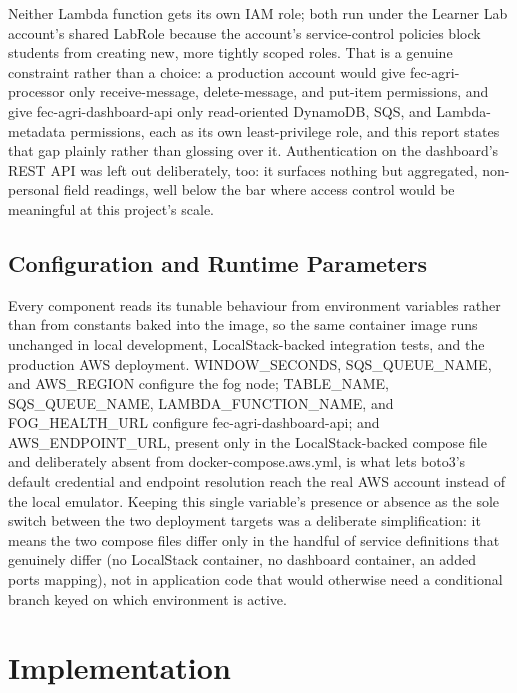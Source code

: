 \documentclass[conference]{IEEEtran}
\begin{document}
Neither Lambda function gets its own IAM role; both run under the Learner Lab account's shared LabRole because the account's service-control policies block students from creating new, more tightly scoped roles. That is a genuine constraint rather than a choice: a production account would give fec-agri-processor only receive-message, delete-message, and put-item permissions, and give fec-agri-dashboard-api only read-oriented DynamoDB, SQS, and Lambda-metadata permissions, each as its own least-privilege role, and this report states that gap plainly rather than glossing over it. Authentication on the dashboard's REST API was left out deliberately, too: it surfaces nothing but aggregated, non-personal field readings, well below the bar where access control would be meaningful at this project's scale.

\subsection{Configuration and Runtime Parameters}
Every component reads its tunable behaviour from environment variables rather than from constants baked into the image, so the same container image runs unchanged in local development, LocalStack-backed integration tests, and the production AWS deployment. WINDOW\_SECONDS, SQS\_QUEUE\_NAME, and AWS\_REGION configure the fog node; TABLE\_NAME, SQS\_QUEUE\_NAME, LAMBDA\_FUNCTION\_NAME, and FOG\_HEALTH\_URL configure fec-agri-dashboard-api; and AWS\_ENDPOINT\_URL, present only in the LocalStack-backed compose file and deliberately absent from docker-compose.aws.yml, is what lets boto3's default credential and endpoint resolution reach the real AWS account instead of the local emulator. Keeping this single variable's presence or absence as the sole switch between the two deployment targets was a deliberate simplification: it means the two compose files differ only in the handful of service definitions that genuinely differ (no LocalStack container, no dashboard container, an added ports mapping), not in application code that would otherwise need a conditional branch keyed on which environment is active.

\section{Implementation}
\end{document}
